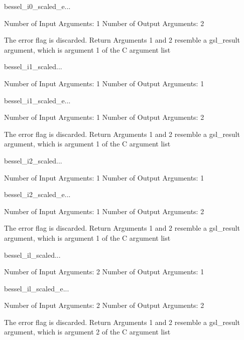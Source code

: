 \begin{funcdesc}{bessel_i0_scaled_e}{...}

    Number of Input  Arguments:  1
    Number of Output Arguments:  2

The error flag is discarded.
Return Arguments 1 and 2 resemble a gsl_result argument,
	which is  argument 1 of the C argument list

\end{funcdesc}

\begin{funcdesc}{bessel_i1_scaled}{...}

    Number of Input  Arguments:  1
    Number of Output Arguments:  1
\end{funcdesc}

\begin{funcdesc}{bessel_i1_scaled_e}{...}

    Number of Input  Arguments:  1
    Number of Output Arguments:  2

The error flag is discarded.
Return Arguments 1 and 2 resemble a gsl_result argument,
	which is  argument 1 of the C argument list

\end{funcdesc}

\begin{funcdesc}{bessel_i2_scaled}{...}

    Number of Input  Arguments:  1
    Number of Output Arguments:  1
\end{funcdesc}

\begin{funcdesc}{bessel_i2_scaled_e}{...}

    Number of Input  Arguments:  1
    Number of Output Arguments:  2

The error flag is discarded.
Return Arguments 1 and 2 resemble a gsl_result argument,
	which is  argument 1 of the C argument list

\end{funcdesc}

\begin{funcdesc}{bessel_il_scaled}{...}

    Number of Input  Arguments:  2
    Number of Output Arguments:  1
\end{funcdesc}

\begin{funcdesc}{bessel_il_scaled_e}{...}

    Number of Input  Arguments:  2
    Number of Output Arguments:  2

The error flag is discarded.
Return Arguments 1 and 2 resemble a gsl_result argument,
	which is  argument 2 of the C argument list

\end{funcdesc}

